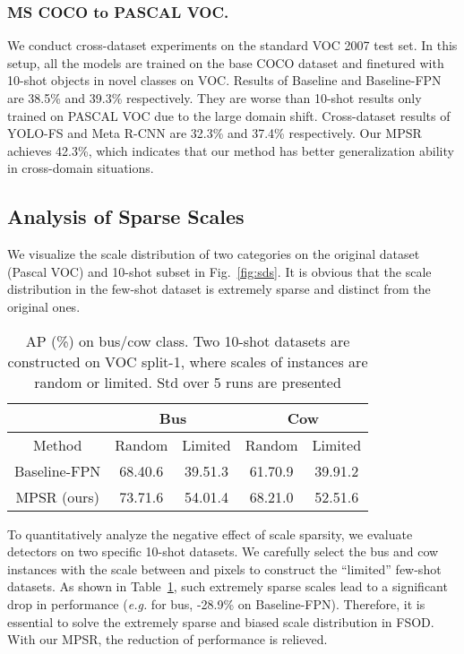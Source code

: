\documentclass[runningheads]{llncs}
\begin{document}
\subsubsection{MS COCO to PASCAL VOC.}
We conduct cross-dataset experiments on the standard VOC 2007 test set. 
In this setup, all the models are trained on the base COCO dataset and finetured with 10-shot objects in novel classes on VOC.
Results of Baseline and Baseline-FPN are 38.5\% and 39.3\% respectively. 
They are worse than 10-shot results only trained on PASCAL VOC due to the large domain shift. 
Cross-dataset results of YOLO-FS and Meta R-CNN are 32.3\% and 37.4\% respectively. 
Our MPSR achieves 42.3\%, which indicates that our method has better generalization ability in cross-domain situations.

\subsection{Analysis of Sparse Scales}
We visualize the scale distribution of two categories on the original dataset (Pascal VOC) and 10-shot subset in Fig.~\ref{fig:sds}.
It is obvious that the scale distribution in the few-shot dataset is extremely sparse and distinct from the original ones.

\setlength{\tabcolsep}{4pt}
\begin{table}
	\begin{center}
		\caption{AP (\%) on bus/cow class. Two 10-shot datasets are constructed on VOC split-1, where scales of instances are random or limited. Std over 5 runs are presented}
		\label{table:extremetable}
		\begin{tabular}{c|cc|cc}
			\hline
			& \multicolumn{2}{c|}{Bus} & \multicolumn{2}{c}{Cow} \\ \hline
			Method       & Random     & Limited     & Random      & Limited     \\ \hline
			Baseline-FPN & 68.40.6       & 39.51.3        & 61.70.9        & 39.91.2         \\
			MPSR (ours)  & 73.71.6       & 54.01.4          & 68.21.0        & 52.51.6        \\ \hline
		\end{tabular}
	\end{center}
\end{table}
\setlength{\tabcolsep}{1.4pt}

To quantitatively analyze the negative effect of scale sparsity, we evaluate detectors on two specific 10-shot datasets. 
We carefully select the bus and cow instances with the scale between  and  pixels to construct the ``limited'' few-shot datasets. 
As shown in Table~\ref{table:extremetable}, such extremely sparse scales lead to a significant drop in performance (\emph{e.g.} for bus, -28.9\% on Baseline-FPN). 
Therefore, it is essential to solve the extremely sparse and biased scale distribution in FSOD.
With our MPSR, the reduction of performance is relieved.
\end{document}
